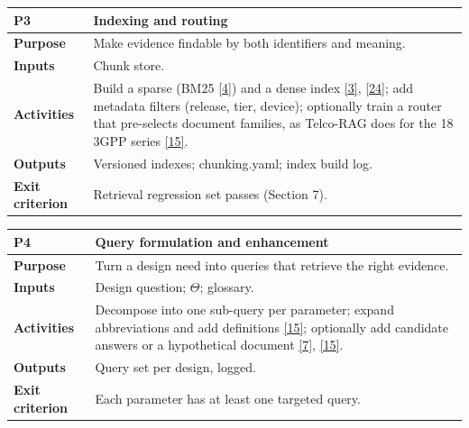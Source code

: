 \documentclass[11pt,a4paper]{article}
\begin{document}
\vspace{-2pt}
{\small
\begin{longtable}{>{\raggedright\arraybackslash}p{}>{\raggedright\arraybackslash}p{}}
\toprule
\rowcolor{headbg} \textbf{P3} & \textbf{Indexing and routing} \\
\midrule
\endfirsthead
\bottomrule
\endlastfoot
\textbf{Purpose} & Make evidence findable by both identifiers and meaning. \\ \arrayrulecolor{rulec}\hline\arrayrulecolor{black}
\textbf{Inputs} & Chunk store. \\ \arrayrulecolor{rulec}\hline\arrayrulecolor{black}
\textbf{Activities} & Build a sparse (BM25 \hyperlink{ref4}{[4]}) and a dense index \hyperlink{ref3}{[3]}, \hyperlink{ref24}{[24]}; add metadata filters (release, tier, device); optionally train a router that pre-selects document families, as Telco-RAG does for the 18 3GPP series \hyperlink{ref15}{[15]}. \\ \arrayrulecolor{rulec}\hline\arrayrulecolor{black}
\textbf{Outputs} & Versioned indexes; chunking.yaml; index build log. \\ \arrayrulecolor{rulec}\hline\arrayrulecolor{black}
\textbf{Exit criterion} & Retrieval regression set passes (Section 7). \\
\end{longtable}
}
\vspace{-2pt}
{\small
\begin{longtable}{>{\raggedright\arraybackslash}p{}>{\raggedright\arraybackslash}p{}}
\toprule
\rowcolor{headbg} \textbf{P4} & \textbf{Query formulation and enhancement} \\
\midrule
\endfirsthead
\bottomrule
\endlastfoot
\textbf{Purpose} & Turn a design need into queries that retrieve the right evidence. \\ \arrayrulecolor{rulec}\hline\arrayrulecolor{black}
\textbf{Inputs} & Design question; \ensuremath{\Theta}; glossary. \\ \arrayrulecolor{rulec}\hline\arrayrulecolor{black}
\textbf{Activities} & Decompose into one sub-query per parameter; expand abbreviations and add definitions \hyperlink{ref15}{[15]}; optionally add candidate answers or a hypothetical document \hyperlink{ref7}{[7]}, \hyperlink{ref15}{[15]}. \\ \arrayrulecolor{rulec}\hline\arrayrulecolor{black}
\textbf{Outputs} & Query set per design, logged. \\ \arrayrulecolor{rulec}\hline\arrayrulecolor{black}
\textbf{Exit criterion} & Each parameter has at least one targeted query. \\
\end{longtable}
}
\end{document}
